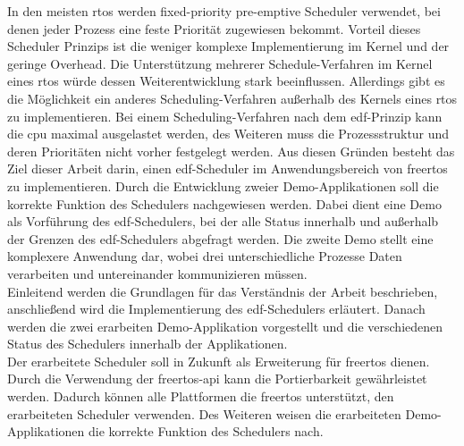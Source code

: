 \documentclass[../EDF Master Thesis.tex]{subfiles}
\begin{document}
    In den meisten \ac{rtos} werden fixed-priority pre-emptive Scheduler verwendet, bei denen jeder Prozess eine feste Priorität zugewiesen bekommt.
    Vorteil dieses Scheduler Prinzips ist die weniger komplexe Implementierung im Kernel und der geringe Overhead.
    Die Unterstützung mehrerer Schedule-Verfahren im Kernel eines \ac{rtos} würde dessen Weiterentwicklung stark beeinflussen.
    Allerdings gibt es die Möglichkeit ein anderes Scheduling-Verfahren außerhalb des Kernels eines \ac{rtos} zu implementieren.
    Bei einem Scheduling-Verfahren nach dem \ac{edf}-Prinzip kann die \ac{cpu} maximal ausgelastet werden, des Weiteren muss die Prozessstruktur und deren Prioritäten nicht vorher festgelegt werden.
    Aus diesen Gründen besteht das Ziel dieser Arbeit darin, einen \ac{edf}-Scheduler im Anwendungsbereich von \ac{freertos} zu implementieren.
    Durch die Entwicklung zweier Demo-Applikationen soll die korrekte Funktion des Schedulers nachgewiesen werden.
    Dabei dient eine Demo als Vorführung des \ac{edf}-Schedulers, bei der alle Status innerhalb und außerhalb der Grenzen des \ac{edf}-Schedulers abgefragt werden.
    Die zweite Demo stellt eine komplexere Anwendung dar, wobei drei unterschiedliche Prozesse Daten verarbeiten und untereinander kommunizieren müssen.\\
    Einleitend werden die Grundlagen für das Verständnis der Arbeit beschrieben, anschließend wird die Implementierung des \ac{edf}-Schedulers erläutert.
    Danach werden die zwei erarbeiten Demo-Applikation vorgestellt und die verschiedenen Status des Schedulers innerhalb der Applikationen.\\
    Der erarbeitete Scheduler soll in Zukunft als Erweiterung für \ac{freertos} dienen.
    Durch die Verwendung der \ac{freertos}-\ac{api} kann die Portierbarkeit gewährleistet werden.
    Dadurch können alle Plattformen die \ac{freertos} unterstützt, den erarbeiteten Scheduler verwenden.
    Des Weiteren weisen die erarbeiteten Demo-Applikationen die korrekte Funktion des Schedulers nach.
\end{document}
